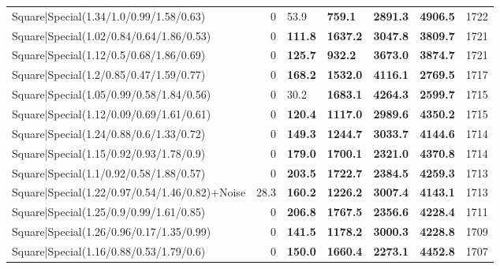 \begin{tabular}{lrllllr}
 Square|Special(1.34/1.0/0.99/1.58/0.63)                       &             0   & 53.9           & \textbf{759.1}  & \textbf{2891.3} & \textbf{4906.5} &         1722 \\
 Square|Special(1.02/0.84/0.64/1.86/0.53)                      &             0   & \textbf{111.8} & \textbf{1637.2} & \textbf{3047.8} & \textbf{3809.7} &         1721 \\
 Square|Special(1.12/0.5/0.68/1.86/0.69)                       &             0   & \textbf{125.7} & \textbf{932.2}  & \textbf{3673.0} & \textbf{3874.7} &         1721 \\
 Square|Special(1.2/0.85/0.47/1.59/0.77)                       &             0   & \textbf{168.2} & \textbf{1532.0} & \textbf{4116.1} & \textbf{2769.5} &         1717 \\
 Square|Special(1.05/0.99/0.58/1.84/0.56)                      &             0   & 30.2           & \textbf{1683.1} & \textbf{4264.3} & \textbf{2599.7} &         1715 \\
 Square|Special(1.12/0.09/0.69/1.61/0.61)                      &             0   & \textbf{120.4} & \textbf{1117.0} & \textbf{2989.6} & \textbf{4350.2} &         1715 \\
 Square|Special(1.24/0.88/0.6/1.33/0.72)                       &             0   & \textbf{149.3} & \textbf{1244.7} & \textbf{3033.7} & \textbf{4144.6} &         1714 \\
 Square|Special(1.15/0.92/0.93/1.78/0.9)                       &             0   & \textbf{179.0} & \textbf{1700.1} & \textbf{2321.0} & \textbf{4370.8} &         1714 \\
 Square|Special(1.1/0.92/0.58/1.88/0.57)                       &             0   & \textbf{203.5} & \textbf{1722.7} & \textbf{2384.5} & \textbf{4259.3} &         1713 \\
 Square|Special(1.22/0.97/0.54/1.46/0.82)+Noise                &            28.3 & \textbf{160.2} & \textbf{1226.2} & \textbf{3007.4} & \textbf{4143.1} &         1713 \\
 Square|Special(1.25/0.9/0.99/1.61/0.85)                       &             0   & \textbf{206.8} & \textbf{1767.5} & \textbf{2356.6} & \textbf{4228.4} &         1711 \\
 Square|Special(1.26/0.96/0.17/1.35/0.99)                      &             0   & \textbf{141.5} & \textbf{1178.2} & \textbf{3000.3} & \textbf{4228.8} &         1709 \\
 Square|Special(1.16/0.88/0.53/1.79/0.6)                       &             0   & \textbf{150.0} & \textbf{1660.4} & \textbf{2273.1} & \textbf{4452.8} &         1707 \\

\end{tabular}
